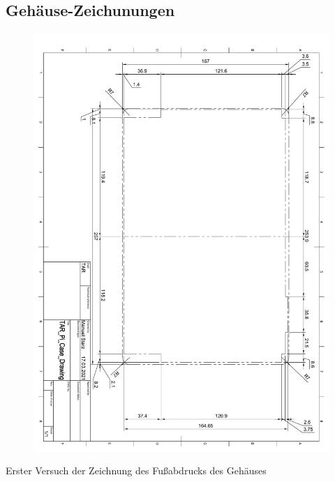 \subsection{Gehäuse-Zeichunungen}\label{ah_gehaeuse}
\begin{figure}[ht!]
	\includegraphics*[width=1\textwidth, page=1]{pdf/gehäuse_zeichnung_fußabdruck_v1.pdf}
 	\label{case_footprint}
\end{figure}
\begin{center}
Erster Versuch der Zeichnung des Fußabdrucks des Gehäuses
\end{center}
\newpage
